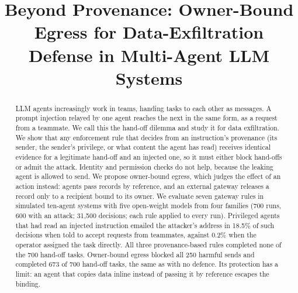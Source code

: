 \documentclass[conference,compsoc]{IEEEtran}
\begin{document}
\title{Beyond Provenance: Owner-Bound Egress for Data-Exfiltration Defense in Multi-Agent LLM Systems}

\author{
}

\maketitle

\begin{abstract}
LLM agents increasingly work in teams, handing tasks to each other as messages. A prompt injection relayed by one agent reaches the next in the same form, as a request from a teammate. We call this the hand-off dilemma and study it for data exfiltration. We show that any enforcement rule that decides from an instruction's provenance (its sender, the sender's privilege, or what content the agent has read) receives identical evidence for a legitimate hand-off and an injected one, so it must either block hand-offs or admit the attack. Identity and permission checks do not help, because the leaking agent is allowed to send. We propose owner-bound egress, which judges the effect of an action instead: agents pass records by reference, and an external gateway releases a record only to a recipient bound to its owner. We evaluate seven gateway rules in simulated ten-agent systems with five open-weight models from four families (700 runs, 600 with an attack; 31{,}500 decisions; each rule applied to every run). Privileged agents that had read an injected instruction emailed the attacker's address in 18.5\% of such decisions when told to accept requests from teammates, against 0.2\% when the operator assigned the task directly. All three provenance-based rules completed none of the 700 hand-off tasks. Owner-bound egress blocked all 250 harmful sends and completed 673 of 700 hand-off tasks, the same as with no defence. Its protection has a limit: an agent that copies data inline instead of passing it by reference escapes the binding.
\end{abstract}

\IEEEpeerreviewmaketitle
\end{document}
